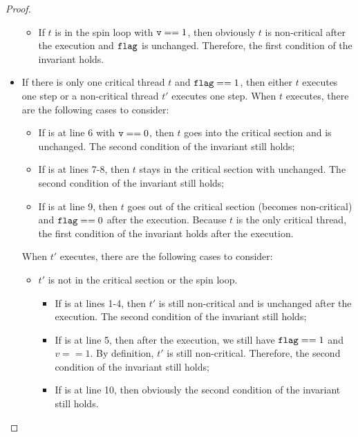 \documentclass{article}[10pt]
\begin{document}
\begin{proof}
\begin{itemize}
\begin{itemize}
\begin{itemize}
      \end{itemize}


    \item If $t$ is in the spin loop with $\text{\ttfamily v} == 1$, then obviously
      $t$ is non-critical after the execution and $\text{\ttfamily flag}$ is
      unchanged. Therefore, the first condition of the invariant
      holds.

    \end{itemize}
    
  \item If there is only one critical thread $t$ and $\text{\ttfamily flag} == 1$,
    then either $t$ executes one step or a non-critical thread $t'$
    executes one step. When $t$ executes, there are the following
    cases to consider:
    \begin{itemize}
    \item If  is at line 6 with $\text{\ttfamily v} == 0$, then $t$ goes into
      the critical section and \kflag is unchanged. The second
      condition of the invariant still holds;

    \item If  is at lines 7-8, then $t$ stays in the critical
      section with \kflag unchanged. The second condition of the
      invariant still holds;

    \item If  is at line 9, then $t$ goes out of the critical
      section (becomes non-critical) and $\text{\ttfamily flag} == 0$ after
      the execution. Because $t$ is the only critical thread, the first
      condition of the invariant holds after the execution.
    \end{itemize}
    When $t'$ executes, there are the following cases to consider:
    \begin{itemize}
    \item $t'$ is not in the critical section or the spin loop. 
      \begin{itemize}
      \item If  is at lines 1-4, then $t'$ is still
        non-critical and \kflag is unchanged after the execution. The
        second condition of the invariant still holds;

      \item If  is at line 5, then after the execution, we
        still have $\text{\ttfamily flag} == 1$ and $v == 1$. By definition, $t'$ is
        still non-critical. Therefore, the second condition of the
        invariant still holds;

      \item If  is at line 10, then obviously the second
        condition of the invariant still holds.


\end{itemize}
\end{itemize}
\end{itemize}
\end{proof}
\end{document}
